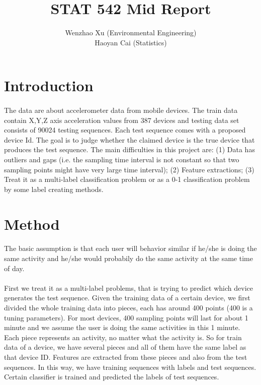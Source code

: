 \documentclass{article}
\author{Wenzhao Xu (Environmental Engineering)\\ Haoyan Cai (Statistics)}
\title{STAT 542 Mid Report}
\begin{document}
	\maketitle
	
	\section{Introduction} %
	\label{sec:introduction}
	\paragraph{} The data are about accelerometer data from mobile devices. The train data contain X,Y,Z axis acceleration values from 387 devices and testing data set consists of 90024 testing sequences. Each test sequence comes with a proposed device Id. The goal is to judge whether the claimed device is the true device that produces the test sequence. The main difficulties in this project are: (1) Data has outliers and gaps (i.e. the sampling time interval is not constant so that two sampling points might have very large time interval); (2) Feature extractions; (3) Treat it as a multi-label classification problem or as a 0-1 classification problem by some label creating methods. 
	
	
	\section{Method} %
	\label{sec:method}
	\paragraph{} The basic assumption is that each user will behavior similar if he/she is doing the same activity and he/she would probabily do the same activity at the same time of day. 
	\paragraph{}First we treat it as a multi-label problems, that is trying to predict which device generates the test sequence. Given the training data of a certain device, we first divided the whole training data into pieces, each has around 400 points (400 is a tuning parameters). For most devices, 400 sampling points will last for about 1 minute and we assume the user is doing the same activities in this 1 minute. Each piece represents an activity, no matter what the activity is. So for train data of a device, we have several pieces and all of them have the same label as that device ID. Features are extracted from these pieces and also from the test sequences. In this way, we have training sequences with labels and test sequences. Certain classifier is trained and predicted the labels of test sequences.
\end{document}
